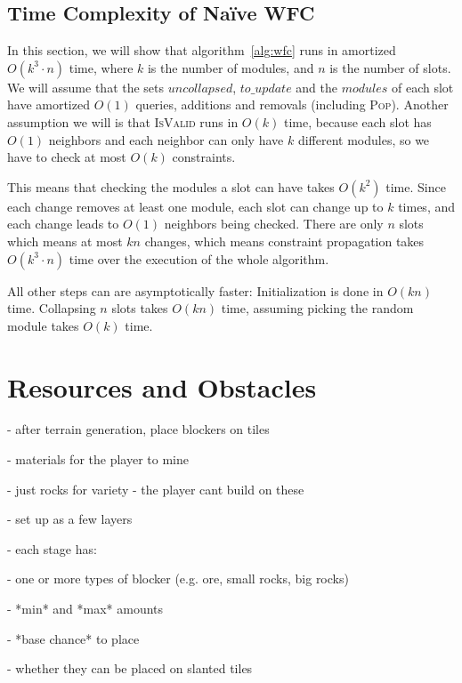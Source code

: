 
\subsection{Time Complexity of Na\"{i}ve WFC}\label{sec:wfc-time-complexity}

In this section, we will show that algorithm~\ref{alg:wfc} runs in amortized $O(k^3 \cdot n)$ time, where $k$ is the number of modules, and $n$ is the number of slots.
We will assume that the sets $uncollapsed$, $to\_update$ and the $modules$ of each slot have amortized $O(1)$ queries, additions and removals (including \textsc{Pop}).
Another assumption we will is that \textsc{IsValid} runs in $O(k)$ time, because each slot has $O(1)$ neighbors and each neighbor can only have $k$ different modules, so we have to check at most $O(k)$ constraints.

This means that checking the modules a slot can have takes $O(k^2)$ time.
Since each change removes at least one module, each slot can change up to $k$ times, and each change leads to $O(1)$ neighbors being checked.
There are only $n$ slots which means at most $kn$ changes, which means constraint propagation takes $O(k^3 \cdot n)$ time over the execution of the whole algorithm.

All other steps can are asymptotically faster:
Initialization is done in $O(kn)$ time.
Collapsing $n$ slots takes $O(kn)$ time, assuming picking the random module takes $O(k)$ time.

\section{Resources and Obstacles}

- after terrain generation, place blockers on tiles

- materials for the player to mine

- just rocks for variety - the player cant build on these

- set up as a few layers

- each stage has:

- one or more types of blocker (e.g. ore, small rocks, big rocks)

- *min* and *max* amounts

- *base chance* to place

- whether they can be placed on slanted tiles

